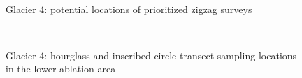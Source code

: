 \documentclass{sfuthesis}
\begin{document}
\begin{appendices}
	\begin{figure}[H]
	\centering
	\\
\caption[]{Glacier 4: potential locations of prioritized zigzag surveys}
\end{figure}
	\begin{figure}[H]
	\centering
	\\
\caption[]{Glacier 4: hourglass and inscribed circle transect sampling locations in the lower ablation area}
\end{figure}
	\begin{figure}[H]
	\centering

\end{figure}
\end{appendices}
\end{document}
